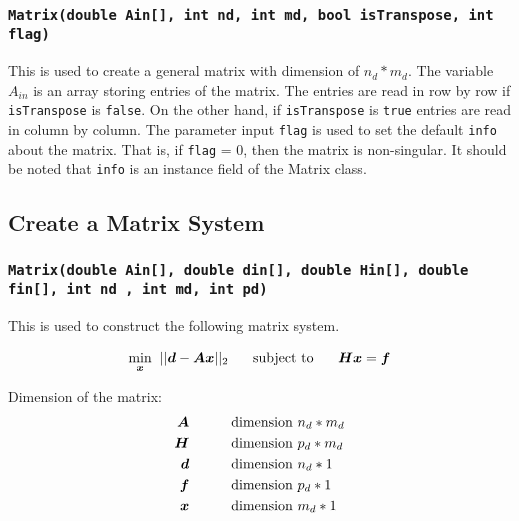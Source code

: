 \documentclass[a4paper]{article}
\begin{document}
\subsubsection{\texttt{Matrix(double Ain[], int nd, int md, bool isTranspose, int flag)}}

This is used to create a general matrix with dimension of $n_{d}*m_{d}$. The variable $A_{in}$ is an array storing entries of the matrix. The entries are read in row by row if \texttt{isTranspose} is \texttt{false}. On the other hand, if  \texttt{isTranspose} is \texttt{true} entries are read in column by column. The parameter input \texttt{flag} is used to set the default \texttt{info}  about the matrix. That is, if \texttt{flag} = 0, then the matrix is non-singular. It should be noted that \texttt{info}  is an instance field of the Matrix class.

 
\subsection{Create a Matrix System}



\subsubsection{\texttt{Matrix(double Ain[], double din[], double Hin[], double fin[], int nd , int md, int pd)}}

This is used to construct the following matrix system.


\begin{equation*}
\begin{aligned}
\underset{\boldsymbol{x}}{\min} \hspace{0.2cm} ||\boldsymbol{d} - \boldsymbol{A}\boldsymbol{x} ||_{2}  \hspace{0.5cm} \text{ subject to } \hspace{0.5cm}   \boldsymbol{H}\boldsymbol{x} = \boldsymbol{f}
\end{aligned}
\end{equation*}

Dimension of the matrix: 
\begin{equation*}
\begin{aligned}
\boldsymbol{A} &\hspace{0.7cm}&& \text{dimension } n_{d}*m_{d} \\
\boldsymbol{H} &\hspace{0.7cm}&& \text{dimension } p_{d}*m_{d}\\
\boldsymbol{d} &\hspace{0.7cm}&& \text{dimension } n_{d}*1\\
\boldsymbol{f} &\hspace{0.7cm}&& \text{dimension } p_{d}*1\\
\boldsymbol{x} &\hspace{0.7cm}&& \text{dimension } m_{d}*1\\
\end{aligned}
\end{equation*}
\end{document}
